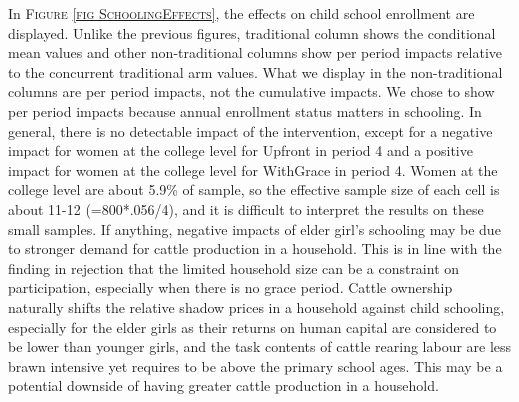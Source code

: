 \begin{figure}
\hfil{}
\end{figure}

	In \textsc{\footnotesize Figure \ref{fig SchoolingEffects}}, the effects on child school enrollment are displayed. Unlike the previous figures, \textsf{traditional} column shows the conditional mean values and other non-\textsf{traditional} columns show per period impacts relative to the concurrent \textsf{traditional} arm values. What we display in the non-\textsf{traditional} columns are per period impacts, not the cumulative impacts. We chose to show per period impacts because annual enrollment status matters in schooling. In general, there is no detectable impact of the intervention, except for a negative impact for women at the college level for \textsf{Upfront} in period 4 and a positive impact for women at the college level for \textsf{WithGrace} in period 4. Women at the college level are about 5.9\% of sample, so the effective sample size of each cell is about 11-12 (=800*.056/4), and it is difficult to interpret the results on these small samples. If anything, negative impacts of elder girl's schooling may be due to stronger demand for cattle production in a household. This is in line with the finding in rejection that the limited household size can be a constraint on participation, especially when there is no grace period. Cattle ownership naturally shifts the relative shadow prices in a household against child schooling, especially for the elder girls as their returns on human capital are considered to be lower than younger girls, and the task contents of cattle rearing labour are less brawn intensive yet requires to be above the primary school ages. This may be a potential downside of having greater cattle production in a household.

